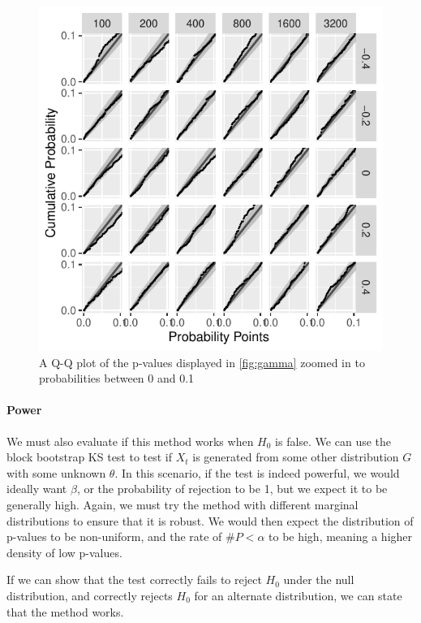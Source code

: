 \documentclass[12pt, letterpaper]{article}
\begin{document}
\begin{figure}[tbp]
  \centering
  \includegraphics[scale=1]{figures/zoom_gamma}
  \caption{A Q-Q plot of the p-values displayed in \ref{fig:gamma} zoomed in to 
  probabilities between 0 and
  0.1}
  \label{fig:zoom_gamma}
\end{figure}


\paragraph{Power}
We must also evaluate if this method works when $H_0$ is false. We can use
the block bootstrap KS test to test if $X_t$ is generated from some other 
distribution $G$ with some unknown $\theta$. In this scenario, if the test is 
indeed powerful,
we would ideally want $\beta$, or the probability of rejection to be 1, but we
expect it to be generally high. Again, we must try the method with different
marginal distributions to ensure that it is robust.
We would then expect the distribution of p-values to be non-uniform, and the rate
of $\#P < \alpha$ to be high, meaning a higher density of low p-values.

If we can show that the test correctly fails to reject $H_0$ under the null
distribution, and correctly rejects $H_0$ for an alternate distribution, we can
state that the method works.
\end{document}
